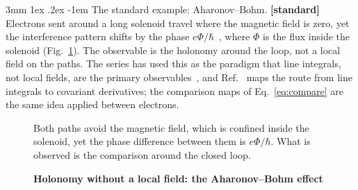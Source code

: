 \documentclass[%
 reprint, amsmath,amssymb, aps, prb, ]{revtex4-2}
\makeatletter
\numberwithin{equation}{section}
\renewcommand\paragraph{%
  \@startsection{paragraph}{4}{\z@}%
    {3mm \@plus 1ex \@minus .2ex}%
    {-1em}%
    {\normalfont\normalsize\itshape}}
\makeatother
\begin{document}
\paragraph{The standard example: Aharonov--Bohm.} \textbf{[standard]} Electrons sent around a long solenoid travel where the magnetic field is zero, yet the interference pattern shifts by the phase $e\Phi/\hbar$~\cite{ref:ab59,ref:tonomura86}, where $\Phi$ is the flux inside the solenoid (Fig.~\ref{fig:ab}). The observable is the holonomy around the loop, not a local field on the paths. The series has used this as the paradigm that line integrals, not local fields, are the primary observables~\cite{ref:p29,ref:p30,ref:p31}, and Ref.~\cite{ref:p63} maps the route from line integrals to covariant derivatives; the comparison maps of Eq.~\eqref{eq:compare} are the same idea applied between electrons.

\begin{figure}[t!]
\centering
{}
\caption{\textbf{Holonomy without a local field: the Aharonov--Bohm effect}}
\label{fig:ab}
\vspace{0.4em}
\begin{minipage}{0.95\columnwidth}
\justifying\small
Both paths avoid the magnetic field, which is confined inside the solenoid, yet the phase difference between them is $e\Phi/\hbar$. What is observed is the comparison around the closed loop.
\end{minipage}
\end{figure}
\end{document}
